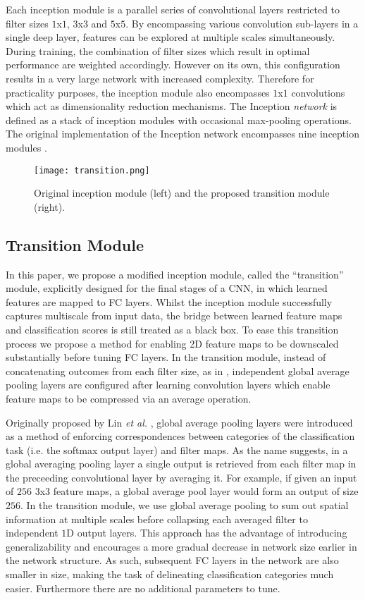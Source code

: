 \documentclass[runningheads,a4paper]{llncs}
\def\etal{\emph{et al. }}
\begin{document}
Each inception module is a parallel series of convolutional layers restricted to filter sizes $1$x$1$, $3$x$3$ and $5$x$5$. By encompassing various convolution sub-layers in a single deep layer, features can be explored at multiple scales simultaneously. During training, the combination of filter sizes which result in optimal performance are weighted accordingly.
However on its own, this configuration results in a very large network with increased complexity. Therefore for practicality purposes, the inception module also encompasses $1$x$1$ convolutions which act as dimensionality reduction mechanisms. The Inception \emph{network} is defined as a stack of inception modules with occasional max-pooling operations. The original implementation of the Inception network encompasses nine inception modules \cite{Szegedy2015}.

\begin{figure}
	\centering
	\texttt{[image: transition.png]}
	\caption{Original inception module (left) and the proposed transition module (right).}
	\label{fig:compare}
\end{figure}

\subsection{Transition Module}

In this paper, we propose a modified inception module, called the ``transition'' module, explicitly designed for the final stages of a CNN, in which learned features are mapped to FC layers. Whilst the inception module successfully captures multiscale from input data, the bridge between learned feature maps and classification scores is still treated as a black box. To ease this transition process we propose a method for enabling 2D feature maps to be downscaled substantially before tuning FC layers.
In the transition module, instead of concatenating outcomes from each filter size, as in \cite{Szegedy2015}, independent global average pooling layers are configured after learning convolution layers which enable feature maps to be compressed via an average operation. 


Originally proposed by Lin \etal \cite{Lin2014}, global average pooling layers were introduced as a method of enforcing correspondences between categories of the classification task (i.e. the softmax output layer) and filter maps. As the name suggests, in a global averaging pooling layer a single output is retrieved from each filter map in the preceeding convolutional layer by averaging it. For example, if given an input of $256$ $3$x$3$ feature maps, a global average pool layer would form an output of size $256$. 
In the transition module, we use global average pooling to sum out spatial information at multiple scales before collapsing each averaged filter to independent $1$D output layers. This approach has the advantage of introducing generalizability and encourages a more gradual decrease in network size earlier in the network structure. As such, subsequent FC layers in the network are also smaller in size, making the task of delineating classification categories much easier. Furthermore there are no additional parameters to tune. 
\end{document}
